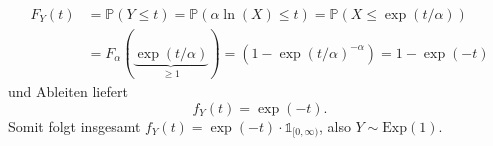 \documentclass[a4paper]{article}
\begin{document}
\begin{enumerate}[label=(\alph*)]
	      \begin{align*}
		      F_Y(t) & = \mathds{P}(Y \leq t) = \mathds{P}(\alpha \ln(X) \leq t) = \mathds{P}(X \leq \exp(t/\alpha))    \\
		             & = F_\alpha(\underbrace{\exp(t/\alpha)}_{\geq 1}) = (1 - \exp(t/\alpha)^{-\alpha}) = 1 - \exp(-t)
	      \end{align*}
	      und Ableiten liefert
	      \begin{equation*}
		      f_Y(t) = \exp(-t)\text{.}
	      \end{equation*}
	      Somit folgt insgesamt $f_Y(t) = \exp(-t) \cdot \mathds{1}_{[0, \infty)}$, also $Y \sim \mathrm{Exp}(1)$.
\end{enumerate}

\subsection{}
\end{document}
